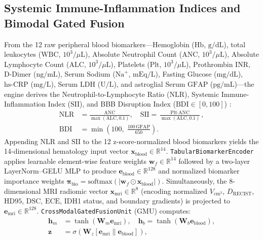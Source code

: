 \documentclass[conference]{IEEEtran}
\begin{document}
\subsection{Systemic Immune-Inflammation Indices and Bimodal Gated Fusion}
From the 12 raw peripheral blood biomarkers---Hemoglobin ($\text{Hb}$, $\text{g/dL}$), total leukocytes ($\text{WBC}$, $10^3/\mu\text{L}$), Absolute Neutrophil Count ($\text{ANC}$, $10^3/\mu\text{L}$), Absolute Lymphocyte Count ($\text{ALC}$, $10^3/\mu\text{L}$), Platelets ($\text{Plt}$, $10^3/\mu\text{L}$), Prothrombin $\text{INR}$, D-Dimer ($\text{ng/mL}$), Serum Sodium ($\text{Na}^+$, $\text{mEq/L}$), Fasting Glucose ($\text{mg/dL}$), $\text{hs-CRP}$ ($\text{mg/L}$), Serum $\text{LDH}$ ($\text{U/L}$), and astroglial Serum $\text{GFAP}$ ($\text{pg/mL}$)---the engine derives the Neutrophil-to-Lymphocyte Ratio ($\text{NLR}$), Systemic Immune-Inflammation Index ($\text{SII}$), and BBB Disruption Index ($\text{BDI} \in [0, 100]$) \cite{bambury2013nlr, abdelrazeq2021sii, perez2021gfap}:
\begin{equation}
\begin{aligned}
    \text{NLR} &= \frac{\text{ANC}}{\max(\text{ALC}, 0.1)}, \quad \text{SII} = \frac{\text{Plt} \cdot \text{ANC}}{\max(\text{ALC}, 0.1)}, \\
    \text{BDI} &= \min\!\left(100,\; \frac{100\,\text{GFAP}}{650}\right).
\end{aligned}
    \label{eq:nlr_sii}
\end{equation}
Appending $\text{NLR}$ and $\text{SII}$ to the 12 z-score-normalized blood biomarkers yields the 14-dimensional hematology input vector $\mathbf{x}_{\text{blood}} \in \mathbb{R}^{14}$. \texttt{TabularBiomarkerEncoder} applies learnable element-wise feature weights $\mathbf{w}_f \in \mathbb{R}^{14}$ followed by a two-layer LayerNorm--GELU MLP to produce $\mathbf{e}_{\text{blood}} \in \mathbb{R}^{128}$ and normalized biomarker importance weights $\boldsymbol{\pi}_{\text{bio}} = \text{softmax}(|\mathbf{w}_f \odot \mathbf{x}_{\text{blood}}|)$. Simultaneously, the 8-dimensional MRI radiomic vector $\mathbf{x}_{\text{mri}} \in \mathbb{R}^8$ (encoding normalized $V_{\text{cm}^3}$, $D_{\text{RECIST}}$, $\text{HD95}$, $\text{DSC}$, $\text{ECE}$, IDH1 status, and boundary gradients) is projected to $\mathbf{e}_{\text{mri}} \in \mathbb{R}^{128}$. \texttt{CrossModalGatedFusionUnit} (GMU) \cite{arevalo2017gmu} computes:
\begin{equation}
\begin{aligned}
    \mathbf{h}_m &= \tanh(\mathbf{W}_m \mathbf{e}_{\text{mri}}), \quad \mathbf{h}_b = \tanh(\mathbf{W}_b \mathbf{e}_{\text{blood}}), \\
    \mathbf{z} &= \sigma\!\left(\mathbf{W}_z [\mathbf{e}_{\text{mri}} \| \mathbf{e}_{\text{blood}}]\right),
\end{aligned}
    \label{eq:gmu_gate}
\end{equation}
\end{document}
